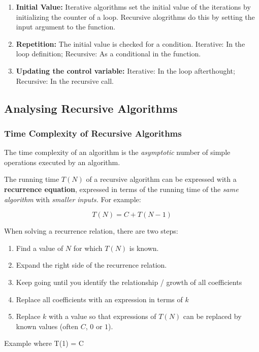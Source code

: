 \begin{enumerate}
    \item \textbf{Initial Value:} Iterative algorithms set the initial value of the iterations by initializing the counter of a loop. Recursive alogrithms do this by setting the input argument to the function.
    \item \textbf{Repetition:} The initial value is checked for a condition. Iterative: In the loop definition; Recursive: As a conditional in the function.
    \item \textbf{Updating the control variable:} Iterative: In the loop afterthought; Recursive: In the recursive call.
\end{enumerate}

\subsection{Analysing Recursive Algorithms}

\subsubsection{Time Complexity of Recursive Algorithms}
The time complexity of an algorithm is the \textit{asymptotic} number of simple operations executed by an algorithm.

The running time \(T(N)\) of a recursive algorithm can be expressed with a \textbf{recurrence equation}, expressed in terms of the running time of the \textit{same algorithm} with \textit{smaller inputs.} For example:

\[
    T(N) = C + T(N-1)
\]

When solving a recurrence relation, there are two steps:

\begin{enumerate}
    \item Find a value of $N$ for which $T(N)$ is known.
    \item Expand the right side of the recurrence relation.
    \item Keep going until you identify the relationship / growth of all coefficients
    \item Replace all coefficients with an expression in terms of  $k$
    \item Replace $k$ with a value so that expressions of $T(N)$ can be replaced by known values (often $C$, $0$ or $1$).
\end{enumerate}

Example where T(1) = C

